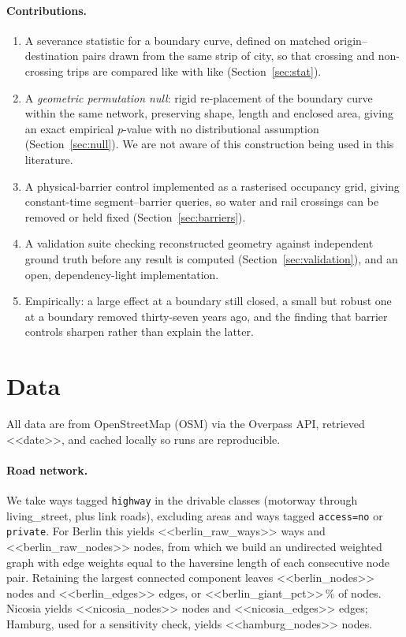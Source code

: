 \documentclass[11pt,a4paper]{article}
\begin{document}
\paragraph{Contributions.}
\begin{enumerate}\itemsep2pt
  \item A severance statistic for a boundary curve, defined on matched
    origin--destination pairs drawn from the same strip of city, so that
    crossing and non-crossing trips are compared like with like
    (Section~\ref{sec:stat}).
  \item A \emph{geometric permutation null}: rigid re-placement of the boundary
    curve within the same network, preserving shape, length and enclosed area,
    giving an exact empirical $p$-value with no distributional assumption
    (Section~\ref{sec:null}). We are not aware of this construction being used
    in this literature.
  \item A physical-barrier control implemented as a rasterised occupancy grid,
    giving constant-time segment--barrier queries, so water and rail crossings
    can be removed or held fixed (Section~\ref{sec:barriers}).
  \item A validation suite checking reconstructed geometry against independent
    ground truth before any result is computed (Section~\ref{sec:validation}),
    and an open, dependency-light implementation.
  \item Empirically: a large effect at a boundary still closed, a small but
    robust one at a boundary removed thirty-seven years ago, and the finding
    that barrier controls sharpen rather than explain the latter.
\end{enumerate}

\section{Data}

All data are from OpenStreetMap (OSM) via the Overpass API, retrieved
<<date>>, and cached locally so runs are reproducible.

\paragraph{Road network.} We take ways tagged \texttt{highway} in the drivable
classes (motorway through living\_street, plus link roads), excluding areas and
ways tagged \texttt{access=no} or \texttt{private}. For Berlin this yields
<<berlin_raw_ways>> ways and <<berlin_raw_nodes>> nodes, from which we build an
undirected weighted graph with edge weights equal to the haversine length of
each consecutive node pair. Retaining the largest connected component leaves
<<berlin_nodes>> nodes and <<berlin_edges>> edges, or <<berlin_giant_pct>>\,\%
of nodes. Nicosia yields <<nicosia_nodes>> nodes and <<nicosia_edges>> edges;
Hamburg, used for a sensitivity check, yields <<hamburg_nodes>> nodes.
\end{document}
